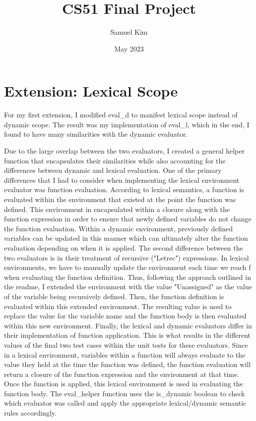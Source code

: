 \documentclass{article}
\title{CS51 Final Project}
\author{Samuel Kim}
\date{May 2023}
\begin{document}
\maketitle

\section{Extension: Lexical Scope}

For my first extension, I modified eval\_d to manifest lexical scope instead of dynamic scope. The result was my implementation of eval\_l, which in the end, I found to have many similarities with the dynamic evaluator. 

Due to the large overlap between the two evaluators, I created a general helper function that encapsulates their similarities while also accounting for the differences between dynamic and lexical evaluation. One of the primary differences that I had to consider when implementing the lexical environment evaluator was function evaluation. According to lexical semantics, a function is evaluated within the environment that existed at the point the function was defined. This environment in encapsulated within a closure along with the function expression in order to ensure that newly defined variables do not change the function evaluation. Within a dynamic environment, previously defined variables can be updated in this manner which can ultimately alter the function evaluation depending on when it is applied. The second difference between the two evaluators is in their treatment of recursive ("Letrec") expressions. In lexical environments, we have to manually update the environment each time we reach f when evaluating the function definition. Thus, following the approach outlined in the readme, I extended the environment with the value "Unassigned" as the value of the variable being recursively defined. Then, the function definition is evaluated within this extended environment. The resulting value is used to replace the value for the variable name and the function body is then evaluated within this new environment. Finally, the lexical and dynamic evaluators differ in their implementation of function application. This is what results in the different values of the final two test cases within the unit tests for these evaluators. Since in a lexical environment, variables within a function will always evaluate to the value they held at the time the function was defined, the function evaluation will return a closure of the function expression and the environment at that time. Once the function is applied, this lexical environment is used in evaluating the function body. The eval\_helper function uses the is\_dynamic boolean to check which evaluator was called and apply the appropriate lexical/dynamic semantic rules accordingly. 
\end{document}

